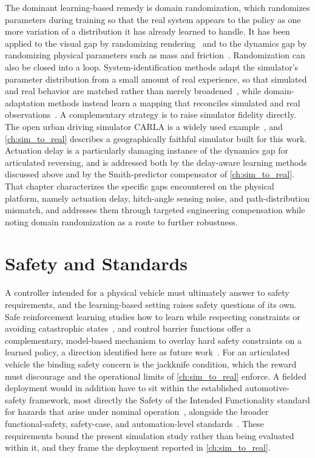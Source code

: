 The dominant learning-based remedy is domain randomization, which randomizes parameters during training so that the real system appears to the policy as one more variation of a distribution it has already learned to handle. It has been applied to the visual gap by randomizing rendering~\cite{tobin2017domain} and to the dynamics gap by randomizing physical parameters such as mass and friction~\cite{peng2018dynamicsrand}. Randomization can also be closed into a loop. System-identification methods adapt the simulator's parameter distribution from a small amount of real experience, so that simulated and real behavior are matched rather than merely broadened~\cite{chebotar2019closingloop}, while domain-adaptation methods instead learn a mapping that reconciles simulated and real observations~\cite{bousmalis2018domainadapt}. A complementary strategy is to raise simulator fidelity directly. The open urban driving simulator CARLA is a widely used example~\cite{dosovitskiy2017carla}, and \cref{ch:sim_to_real} describes a geographically faithful simulator built for this work. Actuation delay is a particularly damaging instance of the dynamics gap for articulated reversing, and is addressed both by the delay-aware learning methods discussed above and by the Smith-predictor compensator of \cref{ch:sim_to_real}. That chapter characterizes the specific gaps encountered on the physical platform, namely actuation delay, hitch-angle sensing noise, and path-distribution mismatch, and addresses them through targeted engineering compensation while noting domain randomization as a route to further robustness.

\section{Safety and Standards}

A controller intended for a physical vehicle must ultimately answer to safety requirements, and the learning-based setting raises safety questions of its own. Safe reinforcement learning studies how to learn while respecting constraints or avoiding catastrophic states~\cite{garcia2015saferl}, and control barrier functions offer a complementary, model-based mechanism to overlay hard safety constraints on a learned policy, a direction identified here as future work~\cite{ames2019cbf}. For an articulated vehicle the binding safety concern is the jackknife condition, which the reward must discourage and the operational limits of \cref{ch:sim_to_real} enforce. A fielded deployment would in addition have to sit within the established automotive-safety framework, most directly the Safety of the Intended Functionality standard for hazards that arise under nominal operation~\cite{iso21448}, alongside the broader functional-safety, safety-case, and automation-level standards~\cite{iso26262, ul4600, sae_j3016}. These requirements bound the present simulation study rather than being evaluated within it, and they frame the deployment reported in \cref{ch:sim_to_real}.

